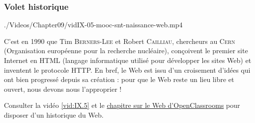 \subsubsection[Volet historique]{Volet historique}
\label{subsub:IX.2.1.2}

\begin{marginvideo}
		{./Videos/Chapter09/vidIX-05-mooc-snt-naissance-web.mp4}%
\end{marginvideo}

C’est en 1990 que Tim \textsc{Berners-Lee} et Robert \textsc{Cailliau}, chercheurs au \textsc{Cern} (Organisation européenne pour la recherche nucléaire), conçoi\-vent le premier site Internet en HTML (langage informatique utilisé pour développer les sites Web) et inventent le protocole HTTP. En bref, le Web est issu d’un croisement d’idées qui ont bien progressé depuis sa création : pour que le Web reste un lieu libre et ouvert, nous devons nous l'approprier !

Consulter la vidéo \cref{vid:IX.5} et le \href{https://openclassrooms.com/fr/courses/4297411-connecter-le-reseau/4304506-assistez-a-la-naissance-du-web#r-4344123}{chapitre sur le Web d'OpenClassrooms} pour disposer d'un historique du Web. 


